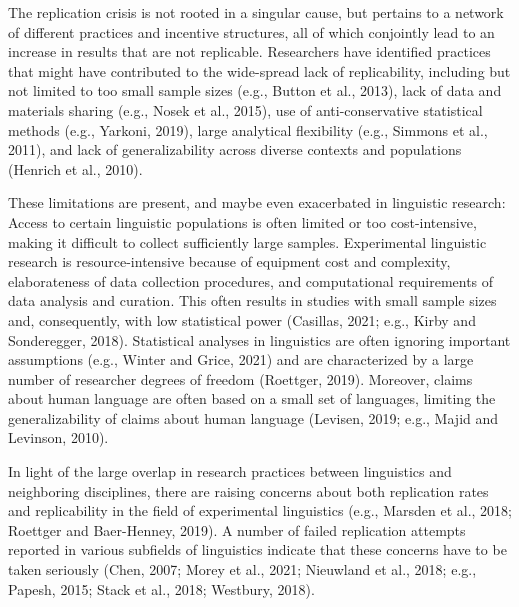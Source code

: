 \documentclass[]{elsarticle} %
\begin{document}
The replication crisis is not rooted in a singular cause, but pertains to a network of different practices and incentive structures, all of which conjointly lead to an increase in results that are not replicable. Researchers have identified practices that might have contributed to the wide-spread lack of replicability, including but not limited to too small sample sizes (e.g., Button et al., 2013), lack of data and materials sharing (e.g., Nosek et al., 2015), use of anti-conservative statistical methods (e.g., Yarkoni, 2019), large analytical flexibility (e.g., Simmons et al., 2011), and lack of generalizability across diverse contexts and populations (Henrich et al., 2010).

These limitations are present, and maybe even exacerbated in linguistic research: Access to certain linguistic populations is often limited or too cost-intensive, making it difficult to collect sufficiently large samples. Experimental linguistic research is resource-intensive because of equipment cost and complexity, elaborateness of data collection procedures, and computational requirements of data analysis and curation. This often results in studies with small sample sizes and, consequently, with low statistical power (Casillas, 2021; e.g., Kirby and Sonderegger, 2018). Statistical analyses in linguistics are often ignoring important assumptions (e.g., Winter and Grice, 2021) and are characterized by a large number of researcher degrees of freedom (Roettger, 2019). Moreover, claims about human language are often based on a small set of languages, limiting the generalizability of claims about human language (Levisen, 2019; e.g., Majid and Levinson, 2010).

In light of the large overlap in research practices between linguistics and neighboring disciplines, there are raising concerns about both replication rates and replicability in the field of experimental linguistics (e.g., Marsden et al., 2018; Roettger and Baer-Henney, 2019). A number of failed replication attempts reported in various subfields of linguistics indicate that these concerns have to be taken seriously (Chen, 2007; Morey et al., 2021; Nieuwland et al., 2018; e.g., Papesh, 2015; Stack et al., 2018; Westbury, 2018).
\end{document}
